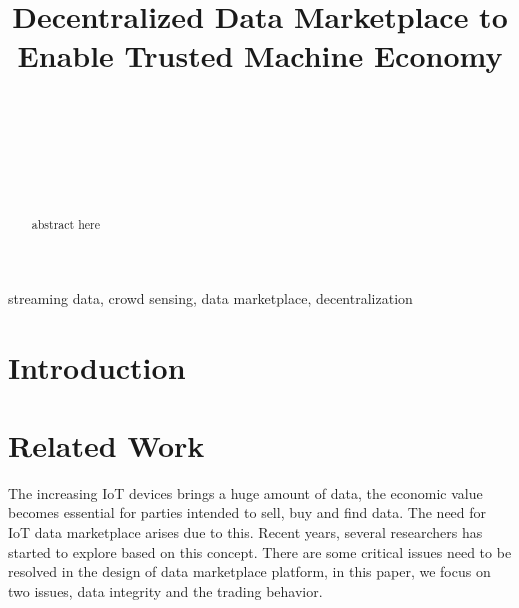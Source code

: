 \documentclass[journal,a4paper]{IEEEtran}
\begin{document}
%
\title{Decentralized Data Marketplace to Enable Trusted Machine Economy}
%
\author{
\\

 \\
 \\

 \\

 \\

}


%


\maketitle              
\begin{abstract}
abstract here
\end{abstract}

\begin{IEEEkeywords}
streaming data, crowd sensing, data marketplace, decentralization
\end{IEEEkeywords}

\section{Introduction}

\section{Related Work}
The increasing IoT devices brings a huge amount of data, the economic value becomes essential for parties intended to sell, buy and find data. The need for IoT data marketplace arises due to this. Recent years, several researchers has started to explore based on this concept. There are some critical issues need to be resolved in the design of data marketplace platform, in this paper, we focus on two issues, data integrity and the trading behavior.
\end{document}
